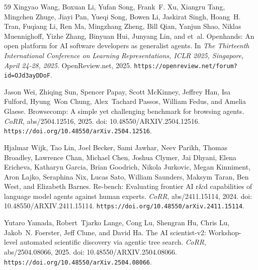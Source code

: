 \documentclass{llmxive}
\providecommand{\url}[1]{\texttt{#1}}
\providecommand{\doi}[1]{doi: #1}
\begin{document}
\begin{thebibliography}{59}
Xingyao Wang, Boxuan Li, Yufan Song, Frank~F. Xu, Xiangru Tang, Mingchen Zhuge, Jiayi Pan, Yueqi Song, Bowen Li, Jaskirat Singh, Hoang~H. Tran, Fuqiang Li, Ren Ma, Mingzhang Zheng, Bill Qian, Yanjun Shao, Niklas Muennighoff, Yizhe Zhang, Binyuan Hui, Junyang Lin, and et~al.
\newblock Openhands: An open platform for {AI} software developers as generalist agents.
\newblock In \emph{The Thirteenth International Conference on Learning Representations, {ICLR} 2025, Singapore, April 24-28, 2025}. OpenReview.net, 2025.
\newblock \url{https://openreview.net/forum?id=OJd3ayDDoF}.

Jason Wei, Zhiqing Sun, Spencer Papay, Scott McKinney, Jeffrey Han, Isa Fulford, Hyung~Won Chung, Alex~Tachard Passos, William Fedus, and Amelia Glaese.
\newblock Browsecomp: {A} simple yet challenging benchmark for browsing agents.
\newblock \emph{CoRR}, abs/2504.12516, 2025.
\newblock \doi{10.48550/ARXIV.2504.12516}.
\newblock \url{https://doi.org/10.48550/arXiv.2504.12516}.

Hjalmar Wijk, Tao Lin, Joel Becker, Sami Jawhar, Neev Parikh, Thomas Broadley, Lawrence Chan, Michael Chen, Joshua Clymer, Jai Dhyani, Elena Ericheva, Katharyn Garcia, Brian Goodrich, Nikola Jurkovic, Megan Kinniment, Aron Lajko, Seraphina Nix, Lucas Sato, William Saunders, Maksym Taran, Ben West, and Elizabeth Barnes.
\newblock Re-bench: Evaluating frontier {AI} r{\&}d capabilities of language model agents against human experts.
\newblock \emph{CoRR}, abs/2411.15114, 2024.
\newblock \doi{10.48550/ARXIV.2411.15114}.
\newblock \url{https://doi.org/10.48550/arXiv.2411.15114}.

Yutaro Yamada, Robert~Tjarko Lange, Cong Lu, Shengran Hu, Chris Lu, Jakob~N. Foerster, Jeff Clune, and David Ha.
\newblock The {AI} scientist-v2: Workshop-level automated scientific discovery via agentic tree search.
\newblock \emph{CoRR}, abs/2504.08066, 2025.
\newblock \doi{10.48550/ARXIV.2504.08066}.
\newblock \url{https://doi.org/10.48550/arXiv.2504.08066}.


\end{thebibliography}
\end{document}
